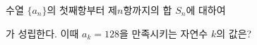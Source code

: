 수열 $\{a_n\}$의 첫째항부터 제$n$항까지의 합 $S_n$에 대하여\par\smallskip{}\par\smallskip\noindent 가 성립한다. 이때 $a_k=128$을 만족시키는 자연수 $k$의 값은?

